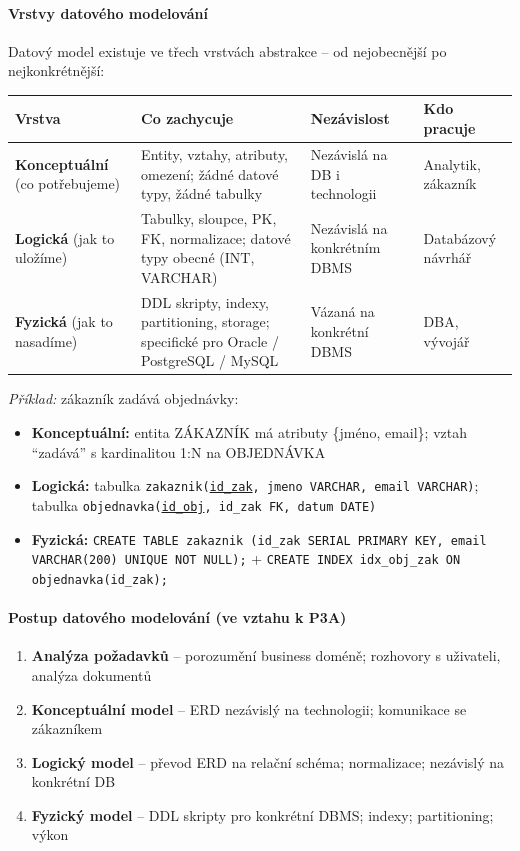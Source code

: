 \paragraph{Vrstvy datového modelování}

Datový model existuje ve třech vrstvách abstrakce -- od nejobecnější po nejkonkrétnější:

\begin{center}
\begin{tabular}{p{2.8cm}p{3.8cm}p{3.8cm}p{3.5cm}}
\toprule
\textbf{Vrstva} & \textbf{Co zachycuje} & \textbf{Nezávislost} & \textbf{Kdo pracuje} \\
\midrule
\textbf{Konceptuální} \newline (co potřebujeme) &
  Entity, vztahy, atributy, omezení; žádné datové typy, žádné tabulky &
  Nezávislá na DB i technologii &
  Analytik, zákazník \\
\midrule
\textbf{Logická} \newline (jak to uložíme) &
  Tabulky, sloupce, PK, FK, normalizace; datové typy obecné (INT, VARCHAR) &
  Nezávislá na konkrétním DBMS &
  Databázový návrhář \\
\midrule
\textbf{Fyzická} \newline (jak to nasadíme) &
  DDL skripty, indexy, partitioning, storage; specifické pro Oracle / PostgreSQL / MySQL &
  Vázaná na konkrétní DBMS &
  DBA, vývojář \\
\bottomrule
\end{tabular}
\end{center}

\textit{Příklad:} zákazník zadává objednávky:
\begin{itemize}
  \item \textbf{Konceptuální:} entita ZÁKAZNÍK má atributy \{jméno, email\}; vztah ``zadává'' s kardinalitou 1:N na OBJEDNÁVKA
  \item \textbf{Logická:} tabulka \texttt{zakaznik(\underline{id\_zak}, jmeno VARCHAR, email VARCHAR)};
    tabulka \texttt{objednavka(\underline{id\_obj}, id\_zak FK, datum DATE)}
  \item \textbf{Fyzická:} \texttt{CREATE TABLE zakaznik (id\_zak SERIAL PRIMARY KEY, email VARCHAR(200) UNIQUE NOT NULL);}
    + \texttt{CREATE INDEX idx\_obj\_zak ON objednavka(id\_zak);}
\end{itemize}

\paragraph{Postup datového modelování (ve vztahu k P3A)}
\begin{enumerate}
  \item \textbf{Analýza požadavků} -- porozumění business doméně; rozhovory s uživateli, analýza dokumentů
  \item \textbf{Konceptuální model} -- ERD nezávislý na technologii; komunikace se zákazníkem
  \item \textbf{Logický model} -- převod ERD na relační schéma; normalizace; nezávislý na konkrétní DB
  \item \textbf{Fyzický model} -- DDL skripty pro konkrétní DBMS; indexy; partitioning; výkon
\end{enumerate}


